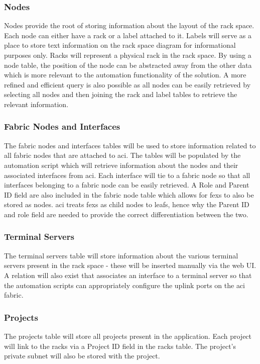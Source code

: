 \subsubsection{Nodes}
\label{design:web-application:database:nodes}
Nodes provide the root of storing
information about the layout of the rack space. Each node can either have a rack
or a label attached to it. Labels will serve as a place to store text
information on the rack space diagram for informational purposes only. Racks
will represent a physical rack in the rack space. By using a node table, the
position of the node can be abstracted away from the other data which is more
relevant to the automation functionality of the solution. A more refined and efficient query is also
possible as all nodes can be easily retrieved by selecting all nodes and then
joining the rack and label tables to retrieve the relevant information.

\subsubsection{Fabric Nodes and Interfaces}
\label{design:web-application:database:fabric-nodes-and-interfaces}
The fabric
nodes and interfaces tables will be used to store information related to all
fabric nodes that are attached to \gls{aci}. The tables will be populated by the automation script which will retrieve information about the
nodes and their associated interfaces from \gls{aci}. Each interface will tie
to a fabric node so that all interfaces belonging to a fabric node can be
easily retrieved. A Role and Parent ID field are also included in the fabric
node table which allows for \gls{fex}s to also be stored as nodes. \gls{aci}
treats \gls{fex}s as child nodes to leafs, hence why the Parent ID and role
field are needed to provide the correct differentiation between the two.

\subsubsection{Terminal Servers}
\label{design:web-application:database:terminal-servers}
The terminal servers
table will store information about the various terminal servers present in the
rack space - these will be inserted manually via the web UI. A relation will
also exist that associates an interface to a terminal server so that the
automation scripts can appropriately configure the uplink ports on the
\gls{aci} fabric.

\subsubsection{Projects}
\label{design:web-application:database:projects}
The projects table will store
all projects present in the application. Each project will link to the racks
via a Project ID field in the racks table. The project's private subnet will
also be stored with the project.

